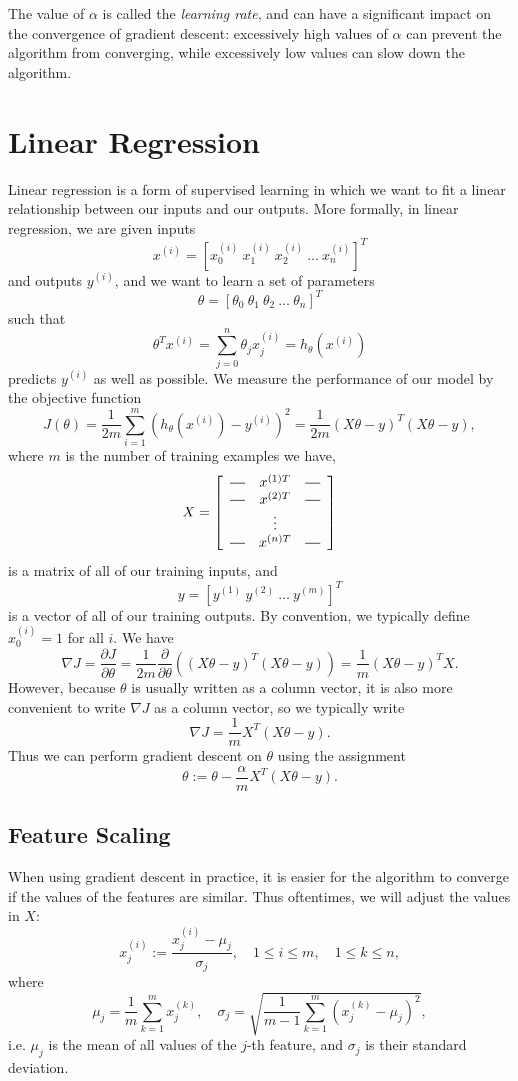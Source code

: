 \documentclass{article}
\newcommand*{\horzbar}{\rule[.5ex]{2.5ex}{0.5pt}}
\begin{document}
The value of $\alpha$ is called the \emph{learning rate}, and can have a significant impact on the convergence of gradient descent: excessively high values of $\alpha$ can prevent the algorithm from converging, while excessively low values can slow down the algorithm.

\section{Linear Regression}\label{linreg}
Linear regression is a form of supervised learning in which we want to fit a linear relationship between our inputs and our outputs. More formally, in linear regression, we are given inputs 
$$x^{(i)} = \left[x_0^{(i)}\ x_1^{(i)}\ x_2^{(i)}\ \dots \ x_n^{(i)}\right]^T$$
and outputs $y^{(i)}$, and we want to learn a set of parameters
$$\theta = \left[\theta_0\ \theta_1\ \theta_2\ \dots \ \theta_n\right]^T$$
such that
$$\theta^T x^{(i)} = \sum_{j=0}^n \theta_j x_j^{(i)} = h_{\theta}\left(x^{(i)}\right)$$
predicts $y^{(i)}$ as well as possible. We measure the performance of our model by the objective function
$$J(\theta) = \frac{1}{2m}\sum_{i=1}^m \left(h_{\theta}\left(x^{(i)}\right) - y^{(i)}\right)^2 = \frac{1}{2m}(X\theta - y)^T(X\theta-y),$$
where $m$ is the number of training examples we have, 
$$X = \left[
\begin{array}{ccc}
\horzbar & x^{(1)T} & \horzbar \\
\horzbar & x^{(2)T} & \horzbar \\
& \vdots & \\
\horzbar & x^{(n)T} & \horzbar \\
\end{array}
\right]$$
is a matrix of all of our training inputs, and
$$y = \left[y^{(1)}\ y^{(2)}\ \dots \ y^{(m)}\right]^T$$
is a vector of all of our training outputs. By convention, we typically define $x_0^{(i)} = 1$ for all $i$. We have
$$\nabla J = \frac{\partial J}{\partial \theta} = \frac{1}{2m} \frac{\partial}{\partial \theta}\left((X\theta - y)^T(X\theta - y)\right) = \frac{1}{m}(X\theta - y)^T X.$$
However, because $\theta$ is usually written as a column vector, it is also more convenient to write $\nabla J$ as a column vector, so we typically write
$$\nabla J = \frac{1}{m} X^T(X\theta - y).$$
Thus we can perform gradient descent on $\theta$ using the assignment
$$\theta := \theta - \frac{\alpha}{m} X^T(X\theta - y).$$
\subsection{Feature Scaling}
When using gradient descent in practice, it is easier for the algorithm to converge if the values of the features are similar. Thus oftentimes, we will adjust the values in $X$:
$$x_j^{(i)} := \frac{x_j^{(i)} - \mu_j}{\sigma_j},\quad 1 \le i \le m, \quad 1 \le k \le n,$$
where
$$\mu_j = \frac{1}{m}\sum_{k=1}^{m}x^{(k)}_j, \quad \sigma_j = \sqrt{\frac{1}{m-1}\sum_{k=1}^m (x^{(k)}_j - \mu_j)^2},$$
i.e. $\mu_j$ is the mean of all values of the $j$-th feature, and $\sigma_j$ is their standard deviation.
\end{document}
